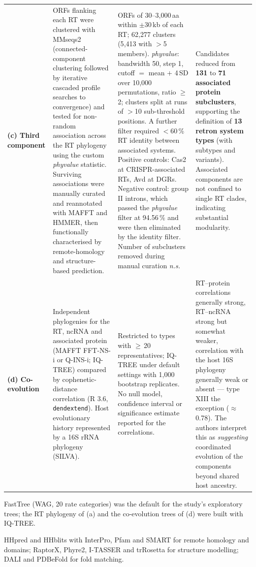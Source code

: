 \begin{table}[H]
\begin{threeparttable}
\begin{tabularx}{\textwidth}{
    >{\raggedright\arraybackslash}p{}
    >{\raggedright\arraybackslash}p{}
    >{\raggedright\arraybackslash}p{}
    >{\raggedright\arraybackslash}X}
\textbf{(c) Third component} &
ORFs flanking each RT were clustered with MMseqs2 (connected-component clustering followed by
iterative cascaded profile searches to convergence) and tested for non-random association across
the RT phylogeny using the custom \textit{phyvalue} statistic. Surviving associations were
manually curated and reannotated with MAFFT and HMMER, then functionally characterised by
remote-homology and structure-based prediction.\tnote{b} &
ORFs of 30--3{,}000\,aa within $\pm$30\,kb of each RT; 62{,}277 clusters (5{,}413 with $>$5
members). \textit{phyvalue}: bandwidth 50, step 1, cutoff $=$ mean $+$ 4\,SD over 10{,}000
permutations, ratio $\geq$\,2; clusters split at runs of $>$10 sub-threshold positions. A further
filter required $<$60\,\% RT identity between associated systems. Positive controls: Cas2 at
CRISPR-associated RTs, Avd at DGRs. Negative control: group II introns, which passed the
\textit{phyvalue} filter at 94.56\,\% and were then eliminated by the identity filter. Number of
subclusters removed during manual curation \textit{n.s.} &
Candidates reduced from \textbf{131} to \textbf{71 associated protein subclusters}, supporting the
definition of \textbf{13 retron system types} (with subtypes and variants). Associated components
are not confined to single RT clades, indicating substantial modularity. \\
\addlinespace
 
\textbf{(d) Co-evolution} &
Independent phylogenies for the RT, ncRNA and associated protein (MAFFT FFT-NS-i or Q-INS-i;
IQ-TREE) compared by cophenetic-distance correlation (R 3.6, \texttt{dendextend}). Host
evolutionary history represented by a 16S rRNA phylogeny (SILVA). &
Restricted to types with $\geq$\,20 representatives; IQ-TREE under default settings with 1{,}000
bootstrap replicates. No null model, confidence interval or significance estimate reported for the
correlations. &
RT--protein correlations generally strong, RT--ncRNA strong but somewhat weaker, correlation with
the host 16S phylogeny generally weak or absent --- type XIII the exception
($\approx$\,0.78). The authors interpret this as \textit{suggesting} coordinated evolution of the
components beyond shared host ancestry. \\
\bottomrule
\end{tabularx}
\begin{tablenotes}[flushleft]\footnotesize
\item[a] FastTree (WAG, 20 rate categories) was the default for the study's exploratory trees; the
RT phylogeny of (a) and the co-evolution trees of (d) were built with IQ-TREE.
\item[b] HHpred and HHblits with InterPro, Pfam and SMART for remote homology and domains;
RaptorX, Phyre2, I-TASSER and trRosetta for structure modelling; DALI and PDBeFold for fold
matching.
\end{tablenotes}
\end{threeparttable}
\end{table}

